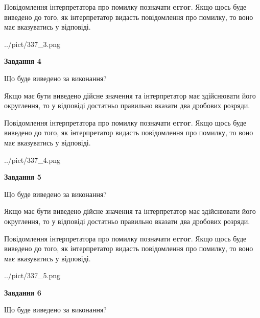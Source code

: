\documentclass[12pt, ukrainian]{article}
\begin{document}
{\begin {Large}
Повідомлення інтерпретатора про помилку позначати \textbf{error}.
Якщо щось буде виведено до того, як інтерпретатор видасть повідомлення про помилку, 
то воно має вказуватись у відповіді. \par

\begin{center}
	{../pict/337_3.png}
\end{center}
\newpage

{\begin {center}\textbf{Завдання 4}\end {center}}\par
Що буде виведено за виконання? \par

Якщо має бути виведено дійсне значення та інтерпретатор має здійснювати його округлення, 
то у відповіді достатньо правильно вказати два дробових розряди.

Повідомлення інтерпретатора про помилку позначати \textbf{error}.
Якщо щось буде виведено до того, як інтерпретатор видасть повідомлення про помилку, 
то воно має вказуватись у відповіді. \par

\begin{center}
	{../pict/337_4.png}
\end{center}
\newpage

{\begin {center}\textbf{Завдання 5}\end {center}}\par
Що буде виведено за виконання? \par

Якщо має бути виведено дійсне значення та інтерпретатор має здійснювати його округлення, 
то у відповіді достатньо правильно вказати два дробових розряди.

Повідомлення інтерпретатора про помилку позначати \textbf{error}.
Якщо щось буде виведено до того, як інтерпретатор видасть повідомлення про помилку, 
то воно має вказуватись у відповіді. \par

\begin{center}
	{../pict/337_5.png}
\end{center}
\newpage

{\begin {center}\textbf{Завдання 6}\end {center}}\par
Що буде виведено за виконання? \par


\end{Large}}
\end{document}
